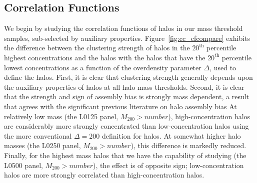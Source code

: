 \documentclass[usenatbib,usegraphicx,letterpaper]{mn2e}
\begin{document}
\subsection{Correlation Functions}
\label{sub:cfresults}

We begin by studying the correlation functions of halos in our mass threshold samples, sub-selected by auxiliary properties. 
Figure~\ref{fig:cc_cfcompare} exhibits the difference between the clustering strength of halos in the $20^{\mathrm{th}}$ percentile highest concentrations and the halos with the halos that have the $20^{\mathrm{th}}$ percentile lowest concentrations as a function of the overdensity parameter $\Delta$, used to define the halos. First, it is clear that clustering strength generally depends upon the auxiliary properties of halos at all halo mass thresholds. Second, it is clear that the strength and sign of assembly bias is 
strongly mass dependent, a result that agrees with the significant previous literature on halo assembly bias  At relatively low mass (the L0125 panel, 
$M_{200} > number$), high-concentration halos are considerably more strongly concentrated 
than low-concentration halos using the more 
conventional $\Delta = 200$ definition for halos. At somewhat higher halo masses (the L0250 panel, $M_{200} > number$), this 
difference is markedly reduced. Finally, for the highest mass halos that we have the capability of studying (the L0500 panel, 
$M_{200} > number$), the effect is of opposite sign; low-concentration halos are more strongly correlated than high-concentration halos.
\end{document}
